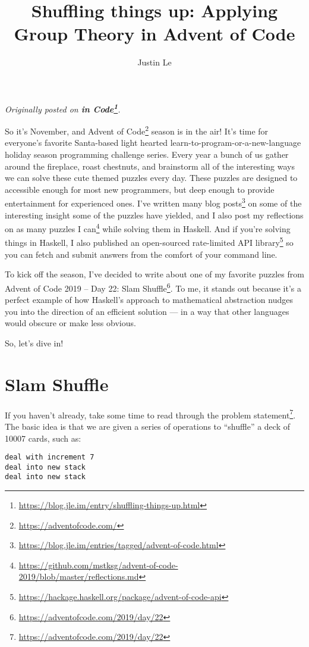 \documentclass[]{article}
\title{Shuffling things up: Applying Group Theory in Advent of Code}
\author{Justin Le}
\renewcommand{\href}[2]{#2\footnote{\url{#1}}}
\begin{document}
\maketitle

\emph{Originally posted on
\textbf{\href{https://blog.jle.im/entry/shuffling-things-up.html}{in Code}}.}

So it's November, and \href{https://adventofcode.com/}{Advent of Code} season is
in the air! It's time for everyone's favorite Santa-based light hearted
learn-to-program-or-a-new-language holiday season programming challenge series.
Every year a bunch of us gather around the fireplace, roast chestnuts, and
brainstorm all of the interesting ways we can solve these cute themed puzzles
every day. These puzzles are designed to accessible enough for most new
programmers, but deep enough to provide entertainment for experienced ones. I've
\href{https://blog.jle.im/entries/tagged/advent-of-code.html}{written many blog
posts} on some of the interesting insight some of the puzzles have yielded, and
I also
\href{https://github.com/mstksg/advent-of-code-2019/blob/master/reflections.md}{post
my reflections on as many puzzles I can} while solving them in Haskell. And if
you're solving things in Haskell, I also published an
\href{https://hackage.haskell.org/package/advent-of-code-api}{open-sourced
rate-limited API library} so you can fetch and submit answers from the comfort
of your command line.

To kick off the season, I've decided to write about one of my favorite puzzles
from Advent of Code 2019 -- \href{https://adventofcode.com/2019/day/22}{Day 22:
Slam Shuffle}. To me, it stands out because it's a perfect example of how
Haskell's approach to mathematical abstraction nudges you into the direction of
an efficient solution --- in a way that other languages would obscure or make
less obvious.

So, let's dive in!

\hypertarget{slam-shuffle}{%
\section{Slam Shuffle}\label{slam-shuffle}}

If you haven't already, take some time to
\href{https://adventofcode.com/2019/day/22}{read through the problem statement}.
The basic idea is that we are given a series of operations to ``shuffle'' a deck
of 10007 cards, such as:

\begin{verbatim}
deal with increment 7
deal into new stack
deal into new stack
\end{verbatim}
\end{document}
